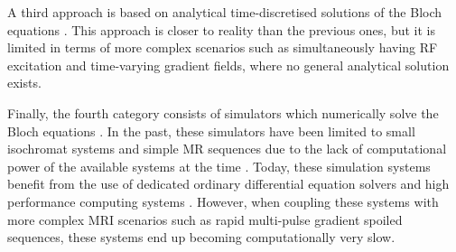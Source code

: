 \hfill

A third approach is based on analytical time-discretised solutions of the Bloch equations \cite{Bittoun1984} \cite{Drobnjak2006} \cite{Jochimsen2006} \cite{Kwan1999} \cite{Liu2017} \cite{Yoder2004}.
This approach is closer to reality than the previous ones, but it is limited in terms of more complex scenarios such as simultaneously having RF excitation and time-varying gradient fields, where no general analytical solution exists.

\hfill

Finally, the fourth category consists of simulators which numerically solve the Bloch equations \cite{Olsson1995} \cite{Summers1986} \cite{Stocker2010}.
In the past, these simulators have been limited to small isochromat systems and simple MR sequences due to the lack of computational power of the available systems at the time \cite{Olsson1995} \cite{Summers1986}.
Today, these simulation systems benefit from the use of dedicated ordinary differential equation solvers and high performance computing systems
\cite{Stocker2010}.
However, when coupling these systems with more complex MRI scenarios such as rapid multi-pulse gradient spoiled sequences, these systems end up becoming computationally very slow.



